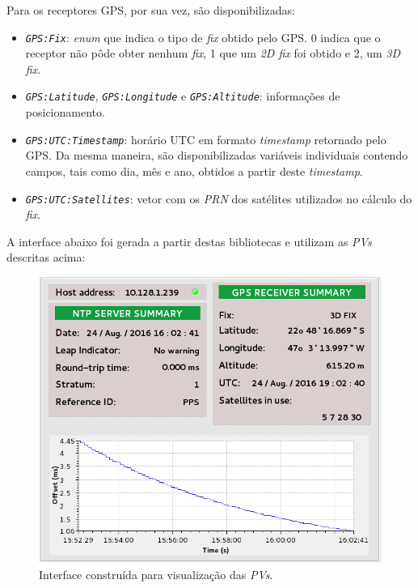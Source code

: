 Para os receptores GPS, por sua vez, são disponibilizadas:

\begin{itemize}

  \renewcommand\labelitemi{--}
  \item \textit{\texttt{GPS:Fix}}: \textit{enum} que indica o tipo de
  \textit{fix} obtido pelo GPS. 0 indica que o receptor não pôde obter nenhum
  \textit{fix}, 1 que um \textit{2D fix} foi obtido e 2, um \textit{3D fix}.
  
  \item \textit{\texttt{GPS:Latitude}}, \textit{\texttt{GPS:Longitude}} e
  \textit{\texttt{GPS:Altitude}}:  informações de posicionamento.

  \item \textit{\texttt{GPS:UTC:Timestamp}}: horário UTC em
  formato \textit{timestamp} retornado pelo GPS. Da mesma maneira, são
  disponibilizadas variáveis individuais contendo campos, tais como dia, mês e
  ano, obtidos a partir deste \textit{timestamp}.
  
  \item  \textit{\texttt{GPS:UTC:Satellites}}: vetor com os \textit{PRN} dos
  satélites utilizados no cálculo do \textit{fix}.
\end{itemize}

A interface abaixo foi gerada a partir destas bibliotecas e utilizam as
\textit{PVs} descritas acima:

\FloatBarrier

\begin{figure}[h]
    
    \centering
    \includegraphics[scale=0.4]{image/epics-opi-ntpgps}
    \caption {Interface construída para visualização das
    \textit{PVs}.}
    \label{img:ntp-opi} 
\end{figure} 

